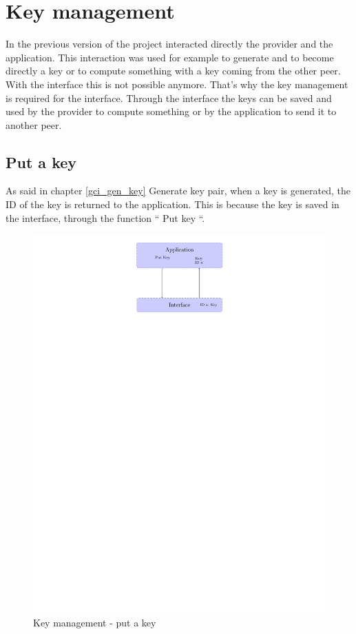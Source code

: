 \section{Key management}

\label{gci_key_mng}

In the previous version of the \embtls project interacted directly the provider
and the application.
This interaction was used for example to generate and to become directly a key
or to compute something with a key coming from the other peer.
With the interface this is not possible anymore.
That's why the key management is required for the interface.
Through the interface the keys can be saved and used by the provider to compute
something or by the application to send it to another peer.


\subsection*{Put a key}
As said in chapter \ref{gci_gen_key} Generate key pair, when a key is generated,
the ID of the key is returned to the application.
This is because the key is saved in the interface, through the function `` Put
key ``.


\begin{figure}[!ht]
\centering
\includegraphics[trim=12cm 22cm 9.5cm 0cm]{figures/key_manag_put_key.pdf}
\caption{Key management - put a key\newline}
\label{fig:gci_key_mng_put}
\end{figure}

